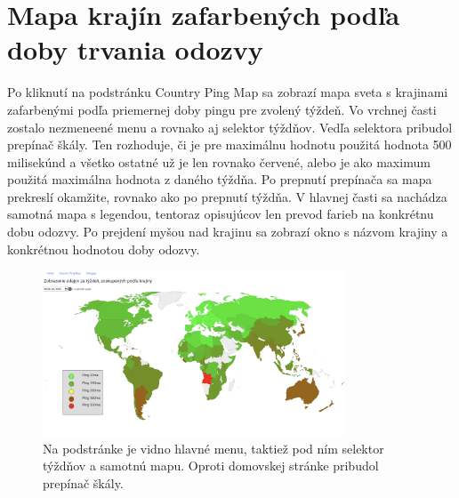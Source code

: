\section{Mapa krajín zafarbených podľa doby trvania odozvy}

Po kliknutí na podstránku Country Ping Map sa zobrazí mapa sveta s krajinami zafarbenými podľa priemernej doby pingu pre zvolený týždeň. Vo vrchnej časti 
zostalo nezmeneené menu a rovnako aj selektor týždňov. Vedľa selektora pribudol prepínač škály. Ten rozhoduje, či je pre maximálnu hodnotu použitá hodnota 
500 milisekúnd a všetko ostatné už je len rovnako červené, alebo je ako maximum použitá maximálna hodnota z daného týždňa. Po prepnutí prepínača sa mapa 
prekreslí okamžite, rovnako ako po prepnutí týždňa. V hlavnej časti sa nachádza samotná mapa s legendou, tentoraz opisujúcov len prevod farieb na konkrétnu 
dobu odozvy. Po prejdení myšou nad krajinu sa zobrazí okno s názvom krajiny a konkrétnou hodnotou doby odozvy.
\begin{figure}
    \centerline{\includegraphics[width=0.8\textwidth]{images/country-ping-info}}
    \caption[Mapa krajín zafarbených podľa priemernej doby odozvy]{Na podstránke je vidno hlavné menu, taktiež pod ním selektor týždňov a samotnú mapu. Oproti 
    domovskej stránke pribudol prepínač škály. }
    \label{obr:country-ping-info}
\end{figure}